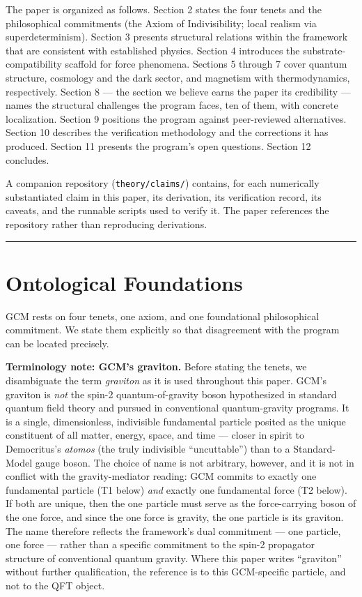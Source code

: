 \documentclass[12pt]{article}
\theoremstyle{definition}
\theoremstyle{remark}
\begin{document}
The paper is organized as follows. Section 2 states the four tenets and
the philosophical commitments (the Axiom of Indivisibility; local
realism via superdeterminism). Section 3 presents structural relations
within the framework that are consistent with established physics.
Section 4 introduces the substrate-compatibility scaffold for force
phenomena. Sections 5 through 7 cover quantum structure, cosmology and
the dark sector, and magnetism with thermodynamics, respectively.
Section 8 --- the section we believe earns the paper its credibility ---
names the structural challenges the program faces, ten of them, with
concrete localization. Section 9 positions the program against
peer-reviewed alternatives. Section 10 describes the verification
methodology and the corrections it has produced. Section 11 presents the
program's open questions. Section 12 concludes.

A companion repository (\texttt{theory/claims/}) contains, for each
numerically substantiated claim in this paper, its derivation, its
verification record, its caveats, and the runnable scripts used to
verify it. The paper references the repository rather than reproducing
derivations.

\begin{center}\rule{0.5\linewidth}{0.5pt}\end{center}

\section{Ontological Foundations}\label{sec:foundations}

GCM rests on four tenets, one axiom, and one foundational philosophical
commitment. We state them explicitly so that disagreement with the
program can be located precisely.

\textbf{Terminology note: GCM's graviton.} Before stating the tenets, we
disambiguate the term \emph{graviton} as it is used throughout this paper.
GCM's graviton is \emph{not} the spin-2 quantum-of-gravity boson hypothesized
in standard quantum field theory and pursued in conventional quantum-gravity
programs. It is a single, dimensionless, indivisible fundamental particle
posited as the unique constituent of all matter, energy, space, and time --- closer in
spirit to Democritus's \emph{atomos} (the truly indivisible ``uncuttable'') than
to a Standard-Model gauge boson. The choice of name is not arbitrary, however,
and it is not in conflict with the gravity-mediator reading: GCM commits to
exactly one fundamental particle (T1 below) \emph{and} exactly one fundamental
force (T2 below). If both are unique, then the one particle must serve as the
force-carrying boson of the one force, and since the one force is gravity, the
one particle is its graviton. The name therefore reflects the framework's dual
commitment --- one particle, one force --- rather than a specific commitment to
the spin-2 propagator structure of conventional quantum gravity. Where this
paper writes ``graviton'' without further qualification, the reference is to
this GCM-specific particle, and not to the QFT object.
\end{document}
